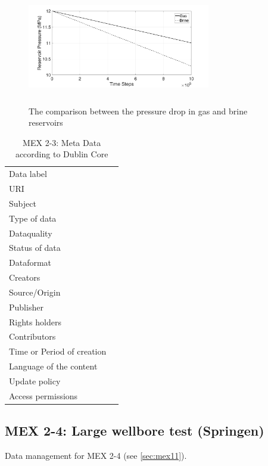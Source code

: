 \begin{figure}[!ht]
\centering
\includegraphics[width=8cm,height=5cm]{figures/Amir_ME4_Pressure_Data.png}
\caption{The comparison between the pressure drop in gas and brine reservoirs}
\label{fig:Amir_ME4_Pressure_Data}
\end{figure}


\begin{table}[!ht]
\caption{MEX 2-3: Meta Data according to Dublin Core}
\label{tab:dms-mex2-3}
\small
\begin{tabular}{R{3cm}|L{7cm}}
\hline
%
Data label &  \\
URI &  \\
Subject  &  \\
Type of data  &  \\
Dataquality  &  \\
Status of data  &  \\
Dataformat  & \\
Creators  &  \\
Source/Origin &  \\
Publisher  &  \\
Rights holders &  \\
Contributors &  \\
Time or Period of creation &  \\
Language of the content &  \\
Update policy &  \\
Access permissions &  \\
%
\hline
\end{tabular}
\end{table}

\subsection{MEX 2-4: Large wellbore test (Springen)}

Data management for MEX 2-4 (see \ref{sec:mex11}).

